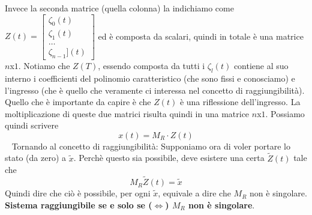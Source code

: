 Invece la seconda matrice (quella colonna) la indichiamo come $Z(t) = \left[\begin{matrix}
    \zeta_0(t)\\
    \zeta_1(t)\\
    \dots\\
    \zeta_{n-1}](t)
\end{matrix}\right]$ ed è composta da scalari, quindi in totale è una matrice $n$x$1$. Notiamo che $Z(T)$, essendo composta da tutti i $\zeta_l(t)$ contiene al suo interno i coefficienti del polinomio caratteristico (che sono fissi e conosciamo) e l'ingresso (che è quello che veramente ci interessa nel concetto di raggiungibilità). Quello che è importante da capire è che $Z(t)$ è una riflessione dell'ingresso.\newline
La moltiplicazione di queste due matrici risulta quindi in una matrice $n$x$1$.\newline
Possiamo quindi scrivere 
\[
    x(t) = M_R \cdot Z(t)
\]
\ \newline
Tornando al concetto di raggiungibilità:\newline
Supponiamo ora di voler portare lo stato (da zero) a $\tilde{x}$. Perchè questo sia possibile, deve esistere una certa $\tilde{Z}(t)$ tale che 
\[
    M_R \tilde{Z}(t) = \tilde{x}
\]
Quindi dire che ciò è possibile, per ogni $\tilde{x}$, equivale a dire che $M_R$ non è singolare.\newline
\newline
\textbf{Sistema raggiungibile se e solo se ($\Leftrightarrow$) $M_R$ non è singolare}.\newline
\newline
